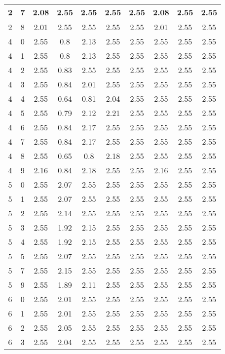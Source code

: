 \begin{longtable}{|c|c||c||c|c|c|c||c|c|c|}
	2 & 7 & 2.08 & 2.55 & 2.55 & 2.55 & 2.55 & 2.08 & 2.55 & 2.55 \\ \hline
	2 & 8 & 2.01 & 2.55 & 2.55 & 2.55 & 2.55 & 2.01 & 2.55 & 2.55 \\ \hline
	4 & 0 & 2.55 & 0.8 & 2.13 & 2.55 & 2.55 & 2.55 & 2.55 & 2.55 \\ \hline
	4 & 1 & 2.55 & 0.8 & 2.13 & 2.55 & 2.55 & 2.55 & 2.55 & 2.55 \\ \hline
	4 & 2 & 2.55 & 0.83 & 2.55 & 2.55 & 2.55 & 2.55 & 2.55 & 2.55 \\ \hline
	4 & 3 & 2.55 & 0.84 & 2.01 & 2.55 & 2.55 & 2.55 & 2.55 & 2.55 \\ \hline
	4 & 4 & 2.55 & 0.64 & 0.81 & 2.04 & 2.55 & 2.55 & 2.55 & 2.55 \\ \hline
	4 & 5 & 2.55 & 0.79 & 2.12 & 2.21 & 2.55 & 2.55 & 2.55 & 2.55 \\ \hline
	4 & 6 & 2.55 & 0.84 & 2.17 & 2.55 & 2.55 & 2.55 & 2.55 & 2.55 \\ \hline
	4 & 7 & 2.55 & 0.84 & 2.17 & 2.55 & 2.55 & 2.55 & 2.55 & 2.55 \\ \hline
	4 & 8 & 2.55 & 0.65 & 0.8 & 2.18 & 2.55 & 2.55 & 2.55 & 2.55 \\ \hline
	4 & 9 & 2.16 & 0.84 & 2.18 & 2.55 & 2.55 & 2.16 & 2.55 & 2.55 \\ \hline
	5 & 0 & 2.55 & 2.07 & 2.55 & 2.55 & 2.55 & 2.55 & 2.55 & 2.55 \\ \hline
	5 & 1 & 2.55 & 2.07 & 2.55 & 2.55 & 2.55 & 2.55 & 2.55 & 2.55 \\ \hline
	5 & 2 & 2.55 & 2.14 & 2.55 & 2.55 & 2.55 & 2.55 & 2.55 & 2.55 \\ \hline
	5 & 3 & 2.55 & 1.92 & 2.15 & 2.55 & 2.55 & 2.55 & 2.55 & 2.55 \\ \hline
	5 & 4 & 2.55 & 1.92 & 2.15 & 2.55 & 2.55 & 2.55 & 2.55 & 2.55 \\ \hline
	5 & 5 & 2.55 & 2.07 & 2.55 & 2.55 & 2.55 & 2.55 & 2.55 & 2.55 \\ \hline
	5 & 7 & 2.55 & 2.15 & 2.55 & 2.55 & 2.55 & 2.55 & 2.55 & 2.55 \\ \hline
	5 & 9 & 2.55 & 1.89 & 2.11 & 2.55 & 2.55 & 2.55 & 2.55 & 2.55 \\ \hline
	6 & 0 & 2.55 & 2.01 & 2.55 & 2.55 & 2.55 & 2.55 & 2.55 & 2.55 \\ \hline
	6 & 1 & 2.55 & 2.01 & 2.55 & 2.55 & 2.55 & 2.55 & 2.55 & 2.55 \\ \hline
	6 & 2 & 2.55 & 2.05 & 2.55 & 2.55 & 2.55 & 2.55 & 2.55 & 2.55 \\ \hline
	6 & 3 & 2.55 & 2.04 & 2.55 & 2.55 & 2.55 & 2.55 & 2.55 & 2.55 \\ \hline

\end{longtable}
